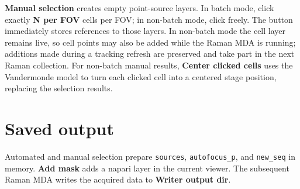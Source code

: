 \documentclass[11pt,oneside]{report}
\newcommand{\ui}[1]{\textbf{#1}}
\newcommand{\code}[1]{\texttt{#1}}
\begin{document}
\ui{Manual selection} creates empty point-source layers. In batch mode, click exactly
\ui{N per FOV} cells per FOV; in non-batch mode, click freely. The button immediately
stores references to those layers. In non-batch mode the cell layer remains live, so
cell points may also be added while the Raman MDA is running; additions made during a
tracking refresh are preserved and take part in the next Raman collection.
For non-batch manual results, \ui{Center clicked cells} uses the Vandermonde model to
turn each clicked cell into a centered stage position, replacing the selection results.

\section*{Saved output}
Automated and manual selection prepare \code{sources}, \code{autofocus\_p}, and
\code{new\_seq} in memory. \ui{Add mask} adds a napari layer in the current viewer.
The subsequent Raman MDA writes the acquired data to \ui{Writer output dir}.
\end{document}
